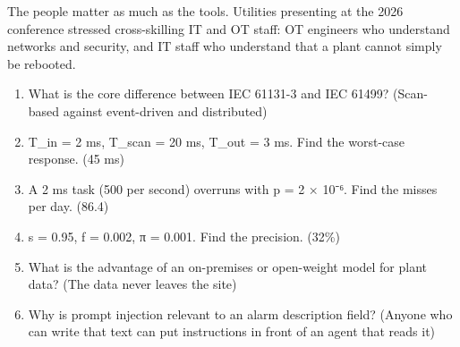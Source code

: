 The people matter as much as the tools. Utilities presenting at the 2026 conference stressed cross-skilling IT and OT staff: OT engineers who understand networks and security, and IT staff who understand that a plant cannot simply be rebooted.


\begin{enumerate}
\item What is the core difference between IEC 61131-3 and IEC 61499? (Scan-based against event-driven and distributed)
\item T\_in = 2 ms, T\_scan = 20 ms, T\_out = 3 ms. Find the worst-case response. (45 ms)
\item A 2 ms task (500 per second) overruns with p = 2 × 10⁻⁶. Find the misses per day. (86.4)
\item s = 0.95, f = 0.002, π = 0.001. Find the precision. (32\%)
\item What is the advantage of an on-premises or open-weight model for plant data? (The data never leaves the site)
\item Why is prompt injection relevant to an alarm description field? (Anyone who can write that text can put instructions in front of an agent that reads it)
\end{enumerate}
